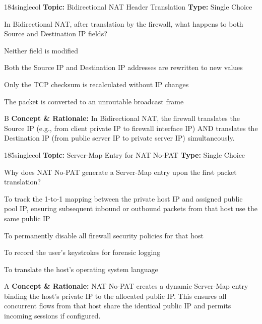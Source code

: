 \begin{qcard}{184}{singlecol}
\textcolor{darkslate!75}{\small\textbf{Topic:} Bidirectional NAT Header Translation \hfill \textbf{Type:} Single Choice}\vspace{0.4em}\par
In Bidirectional NAT, after translation by the firewall, what happens to both Source and Destination IP fields?
\begin{qoptions}
\item Neither field is modified
\item Both the Source IP and Destination IP addresses are rewritten to new values
\item Only the TCP checksum is recalculated without IP changes
\item The packet is converted to an unroutable broadcast frame
\end{qoptions}
\end{qcard}
\nopagebreak
\begin{explainbox}{B}
\textbf{Concept \& Rationale:} In Bidirectional NAT, the firewall translates the Source IP (e.g., from client private IP to firewall interface IP) AND translates the Destination IP (from public server IP to private server IP) simultaneously.
\end{explainbox}

\begin{qcard}{185}{singlecol}
\textcolor{darkslate!75}{\small\textbf{Topic:} Server-Map Entry for NAT No-PAT \hfill \textbf{Type:} Single Choice}\vspace{0.4em}\par
Why does NAT No-PAT generate a Server-Map entry upon the first packet translation?
\begin{qoptions}
\item To track the 1-to-1 mapping between the private host IP and assigned public pool IP, ensuring subsequent inbound or outbound packets from that host use the same public IP
\item To permanently disable all firewall security policies for that host
\item To record the user's keystrokes for forensic logging
\item To translate the host's operating system language
\end{qoptions}
\end{qcard}
\nopagebreak
\begin{explainbox}{A}
\textbf{Concept \& Rationale:} NAT No-PAT creates a dynamic Server-Map entry binding the host's private IP to the allocated public IP. This ensures all concurrent flows from that host share the identical public IP and permits incoming sessions if configured.
\end{explainbox}

